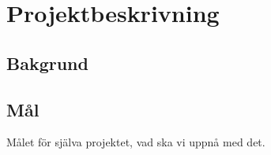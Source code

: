 \section{Projektbeskrivning}

\subsection{Bakgrund}

\subsection{Mål}
Målet för själva projektet, vad ska vi uppnå med det.



